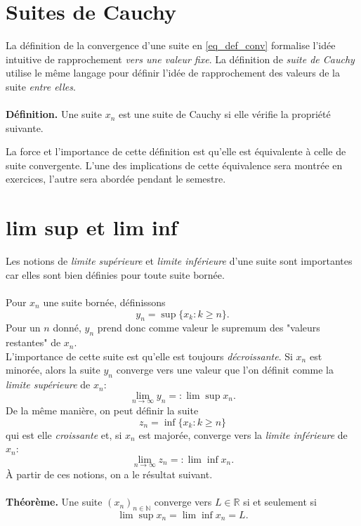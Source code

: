 \documentclass[oneside,11pt,french,table]{book}
\theoremstyle{definition}
\theoremstyle{plain}
\theoremstyle{remark}
\begin{document}
\section{Suites de Cauchy}
La définition de la convergence d'une suite en \eqref{eq_def_conv} formalise l'idée intuitive de rapprochement \textit{vers une valeur fixe}. La définition de \textit{suite de Cauchy} utilise le même langage pour définir l'idée de rapprochement des valeurs de la suite \textit{entre elles}. \\
\\
\textbf{Définition.} Une suite $x_n$ est une suite de Cauchy si elle vérifie la propriété suivante.
\begin{center}
\end{center}
La force et l'importance de cette définition est qu'elle est équivalente à celle de suite convergente. L'une des implications de cette équivalence sera montrée en exercices, l'autre sera abordée pendant le semestre.
\section{lim sup et lim inf}
Les notions de \textit{limite supérieure} et \textit{limite inférieure} d'une suite sont importantes car elles sont bien définies pour toute suite bornée. \\
\\
Pour $x_n$ une suite bornée, définissons
$$y_n = \sup \{ x_k : k \geq n \}.$$
Pour un $n$ donné, $y_n$ prend donc comme valeur le supremum des "valeurs restantes" de $x_n$. \\
L'importance de cette suite est qu'elle est toujours \textit{décroissante}. Si $x_n$ est minorée, alors la suite $y_n$ converge vers une valeur que l'on définit comme la \textit{limite supérieure} de $x_n$:
$$\lim\limits_{n \to \infty} y_n =: \lim \sup x_n.$$
De la même manière, on peut définir la suite
$$z_n = \inf \{ x_k : k \geq n \}$$
qui est elle \textit{croissante} et, si $x_n$ est majorée, converge vers la \textit{limite inférieure} de $x_n$:
$$\lim\limits_{n \to \infty} z_n =: \lim \inf x_n.$$
À partir de ces notions, on a le résultat suivant. \\ \\
\textbf{Théorème.} Une suite $(x_n)_{n \in \mathbb{N}}$ converge vers $L \in \mathbb{R}$ si et seulement si
$$\lim \sup x_n = \lim \inf x_n = L.$$
\end{document}
